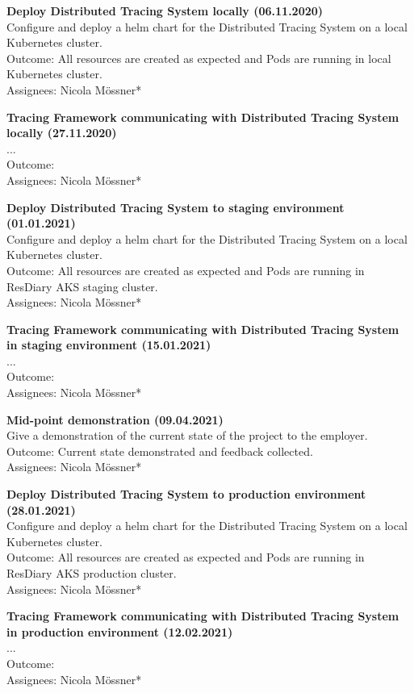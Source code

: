 \documentclass[11pt]{article}
\begin{document}
\textbf{Deploy Distributed Tracing System locally (06.11.2020)}\\
Configure and deploy a helm chart for the Distributed Tracing System on a local Kubernetes cluster.\\
Outcome: All resources are created as expected and Pods are running in local Kubernetes cluster.\\
Assignees: Nicola M\"{o}ssner*

\textbf{Tracing Framework communicating with Distributed Tracing System locally (27.11.2020)}\\
...\\
Outcome: \\
Assignees: Nicola M\"{o}ssner*

\textbf{Deploy Distributed Tracing System to staging environment (01.01.2021)}\\
Configure and deploy a helm chart for the Distributed Tracing System on a local Kubernetes cluster.\\
Outcome: All resources are created as expected and Pods are running in ResDiary AKS staging cluster.\\
Assignees: Nicola M\"{o}ssner*

\textbf{Tracing Framework communicating with Distributed Tracing System in staging environment (15.01.2021)}\\
...\\
Outcome: \\
Assignees: Nicola M\"{o}ssner*

\textbf{Mid-point demonstration (09.04.2021)}\\
Give a demonstration of the current state of the project to the employer.\\
Outcome: Current state demonstrated and feedback collected.\\
Assignees: Nicola M\"{o}ssner*

\textbf{Deploy Distributed Tracing System to production environment (28.01.2021)}\\
Configure and deploy a helm chart for the Distributed Tracing System on a local Kubernetes cluster.\\
Outcome: All resources are created as expected and Pods are running in ResDiary AKS production cluster.\\
Assignees: Nicola M\"{o}ssner*

\textbf{Tracing Framework communicating with Distributed Tracing System in production environment (12.02.2021)}\\
...\\
Outcome: \\
Assignees: Nicola M\"{o}ssner*
\end{document}
